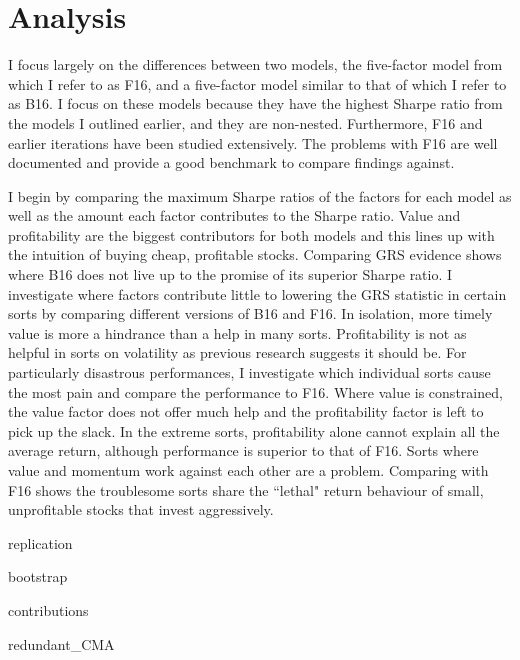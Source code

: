 
\section{Analysis}

I focus largely on the differences between two models, the five-factor model from
\textcite{fama2016dissecting} which I refer to as F16, and a five-factor model similar to
that of \textcite{ball2016accruals} which I refer to as B16. I focus on these models
because they have the highest Sharpe ratio from the models I outlined earlier, and they
are non-nested. Furthermore, F16 and earlier iterations have been studied extensively. The
problems with F16 are well documented and provide a good benchmark to compare findings
against.

I begin by comparing the maximum Sharpe ratios of the factors for each model as well as
the amount each factor contributes to the Sharpe ratio. Value and profitability are the
biggest contributors for both models and this lines up with the intuition of buying cheap,
profitable stocks. Comparing GRS evidence shows where B16 does not live up to the promise
of its superior Sharpe ratio. I investigate where factors contribute little to lowering
the GRS statistic in certain sorts by comparing different versions of B16 and F16. In
isolation, more timely value is more a hindrance than a help in many sorts. Profitability
is not as helpful in sorts on volatility as previous research
\parencite{novy2014understanding} suggests it should be. For particularly disastrous
performances, I investigate which individual sorts cause the most pain and compare the
performance to F16. Where value is constrained, the value factor does not offer much help
and the profitability factor is left to pick up the slack. In the extreme sorts,
profitability alone cannot explain all the average return, although performance is
superior to that of F16. Sorts where value and momentum work against each other are a
problem. Comparing with F16 shows the troublesome sorts share the ``lethal" return
behaviour of small, unprofitable stocks that invest aggressively.

{replication}

{bootstrap}

{contributions}

{redundant_CMA}



